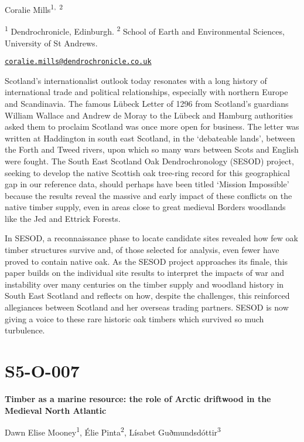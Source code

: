 \documentclass[
]{book}
\begin{document}
Coralie Mills\textsuperscript{1,~2}

\textsuperscript{1} Dendrochronicle, Edinburgh. \textsuperscript{2} School of Earth and Environmental Sciences, University of St Andrews.

\href{mailto:coralie.mills@dendrochronicle.co.uk}{\nolinkurl{coralie.mills@dendrochronicle.co.uk}}

Scotland's internationalist outlook today resonates with a long history of international trade and political relationships, especially with northern Europe and Scandinavia. The famous Lübeck Letter of 1296 from Scotland's guardians William Wallace and Andrew de Moray to the Lübeck and Hamburg authorities asked them to proclaim Scotland was once more open for business. The letter was written at Haddington in south east Scotland, in the `debateable lands', between the Forth and Tweed rivers, upon which so many wars between Scots and English were fought. The South East Scotland Oak Dendrochronology (SESOD) project, seeking to develop the native Scottish oak tree-ring record for this geographical gap in our reference data, should perhaps have been titled `Mission Impossible' because the results reveal the massive and early impact of these conflicts on the native timber supply, even in areas close to great medieval Borders woodlands like the Jed and Ettrick Forests.

In SESOD, a reconnaissance phase to locate candidate sites revealed how few oak timber structures survive and, of those selected for analysis, even fewer have proved to contain native oak. As the SESOD project approaches its finale, this paper builds on the individual site results to interpret the impacts of war and instability over many centuries on the timber supply and woodland history in South East Scotland and reflects on how, despite the challenges, this reinforced allegiances between Scotland and her overseas trading partners. SESOD is now giving a voice to these rare historic oak timbers which survived so much turbulence.

\hypertarget{s5-o-007}{%
\section*{S5-O-007}\label{s5-o-007}}

\textbf{Timber as a marine resource: the role of Arctic driftwood in the Medieval North Atlantic}

Dawn Elise Mooney\textsuperscript{1}, Élie Pinta\textsuperscript{2}, Lísabet Guðmundsdóttir\textsuperscript{3}
\end{document}
